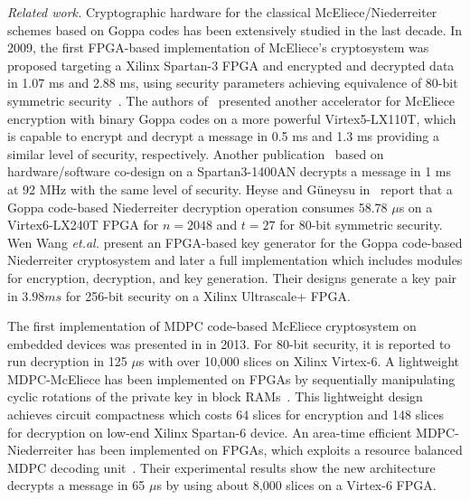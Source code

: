 \documentclass[preprint]{iacrtrans}
\begin{document}
\textit{Related work.} Cryptographic hardware for the classical McEliece/Niederreiter schemes based on Goppa
codes has been extensively studied in the last decade. In 2009, the first FPGA-based implementation of McEliece's cryptosystem was proposed targeting
a Xilinx Spartan-3 FPGA and encrypted and decrypted data in 1.07 ms and 2.88 ms, using
security parameters achieving equivalence of 80-bit symmetric security~\cite{eisenbarth2009microeliece}.
The authors of~\cite{shoufan2010novel} presented another accelerator for McEliece encryption with binary Goppa codes on a more powerful Virtex5-LX110T, which is capable to encrypt and decrypt a message in 0.5 ms and 1.3 ms providing a similar level of security, respectively. Another publication~\cite{ghosh2012speed} based on
hardware/software co-design on a Spartan3-1400AN decrypts a message in 1 ms at 92 MHz with
the same level of security. Heyse and G\"uneysu in~\cite{heyse2012towards} report that a Goppa code-based Niederreiter decryption operation consumes 58.78 $\mu$s on a Virtex6-LX240T FPGA for $n = 2048$ and $t = 27$ for 80-bit symmetric security.  Wen Wang \textit{et.al.} present an FPGA-based key generator for the Goppa code-based Niederreiter cryptosystem \cite{wang2017fpga} and later a full implementation \cite{wang2018fpga} which includes modules for encryption, decryption, and key generation. Their designs generate a key pair in $3.98 ms$ for 256-bit security on a Xilinx Ultrascale+ FPGA.

The first implementation of MDPC code-based McEliece cryptosystem on embedded devices was presented in \cite{heyse2013smaller} in 2013. For 80-bit security, it is reported to run decryption in 125 $\mu$s with over 10,000 slices on Xilinx Virtex-6. A lightweight MDPC-McEliece has been implemented on FPGAs by sequentially manipulating cyclic rotations of the private key in block RAMs~\cite{von2014lightweight}. This lightweight design achieves circuit compactness which costs 64 slices for encryption and 148 slices for decryption on low-end Xilinx Spartan-6 device. An area-time efficient MDPC-Niederreiter has been implemented on FPGAs, which exploits a resource balanced MDPC decoding unit~\cite{hu2017area}. Their experimental results show the new architecture decrypts a message in 65 $\mu$s by using about 8,000 slices on a Virtex-6 FPGA.
\end{document}
